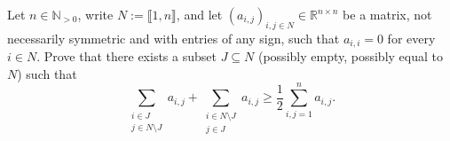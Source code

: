 %
\begin{problem}
    Let \( n \in \mathbb{N}_{>0} \), write \( N := \llbracket 1, n \rrbracket \), and let \( \left(a_{i,j}\right)_{i,j \in N} \in \mathbb{R}^{n \times n} \) be a matrix, not necessarily symmetric and with entries of any sign, such that \( a_{i,i} = 0 \) for every \( i \in N \). Prove that there exists a subset \( J \subseteq N \) (possibly empty, possibly equal to \( N \)) such that
    \[
        \sum_{\substack{i \in J \\ j \in N \setminus J}} a_{i,j} + \sum_{\substack{i \in N \setminus J \\ j \in J}} a_{i,j} \geq \frac{1}{2} \sum_{i,j=1}^{n} a_{i,j}.
    \]
\end{problem}
